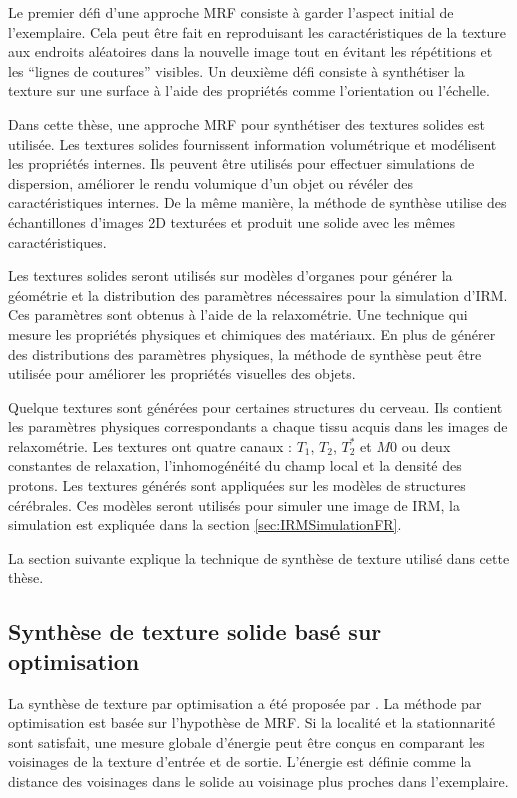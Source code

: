 Le premier défi d'une approche MRF consiste à
garder l'aspect initial de l'exemplaire.
Cela peut être fait en reproduisant les caractéristiques de la texture aux endroits aléatoires dans
la nouvelle image tout en évitant les répétitions et les ``lignes de coutures'' visibles.
Un deuxième défi consiste à synthétiser la texture sur une surface à l'aide des propriétés
comme l'orientation ou l'échelle.

Dans cette thèse,
une approche MRF pour synthétiser des textures solides est utilisée.
Les textures solides fournissent information volumétrique
et modélisent les propriétés internes.
Ils peuvent être utilisés pour effectuer simulations de dispersion,
améliorer le rendu volumique d'un objet ou révéler
des caractéristiques internes.
De la même manière, la méthode de synthèse utilise des échantillones d'images 2D texturées
et produit une solide avec les mêmes caractéristiques.

Les textures solides seront utilisés sur modèles d'organes
pour générer la géométrie et la distribution 
des paramètres nécessaires pour la simulation d'IRM.
Ces paramètres sont obtenus à l'aide de la relaxométrie. Une technique qui mesure
les propriétés physiques et chimiques des matériaux.
En plus de générer des distributions des paramètres physiques,
la méthode de synthèse peut être utilisée
pour améliorer les propriétés visuelles des objets.

Quelque textures sont générées pour certaines structures du cerveau.
Ils contient les paramètres physiques correspondants
a chaque tissu acquis dans les images de relaxométrie.
Les textures ont quatre canaux : $T_1$, $T_2$, $T_2^*$ et $M0$
ou deux constantes de relaxation, l'inhomogénéité du champ local et la densité des protons.
Les textures générés sont appliquées sur les modèles de structures cérébrales.
Ces modèles seront utilisés pour simuler une image de IRM,
la simulation est expliquée dans la section \ref{sec:IRMSimulationFR}.

La section suivante explique la technique de synthèse de texture 
utilisé dans cette thèse.

\subsection{Synthèse de texture solide basé sur optimisation}

La synthèse de texture par optimisation a été proposée par \cite{kwatra:2005:SIGGRAPH}.
La méthode par optimisation est basée sur
l'hypothèse de MRF. 
Si la localité et la stationnarité sont
satisfait, une mesure globale d'énergie peut
être conçus en comparant les voisinages de la texture d'entrée et de sortie.
L'énergie est définie comme la distance des voisinages dans le solide au voisinage plus proches dans 
l'exemplaire. 

